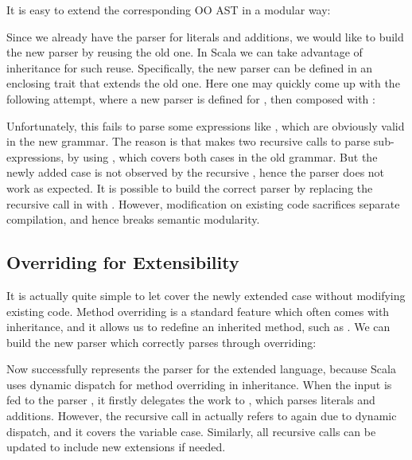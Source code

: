It is easy to extend the corresponding OO AST in a modular way:


Since we already have the parser for literals and additions, we would
like to build the new parser by reusing the old one. In Scala we can take advantage of inheritance for such reuse. Specifically,
the new parser can be defined in an enclosing trait that extends
the old one. Here one may quickly come up
with the following attempt, where a new parser is defined for , then composed
with :


Unfortunately, this fails to parse some expressions like , which are obviously valid in the new grammar.
The reason is that  makes two recursive calls to parse sub-expressions, by using , which
covers both cases in the old grammar. But the newly added case  is not observed by the recursive ,
hence the parser does not work as expected. It is possible to build the correct parser by replacing the recursive call in  with .
However, modification on existing code sacrifices separate compilation, and hence breaks semantic modularity.

\subsection{Overriding for Extensibility}\label{subsec:overriding}

It is actually quite simple to let  cover the newly
extended case without modifying existing code. Method overriding is a
standard feature which often comes with inheritance, and it allows us
to redefine an inherited method, such as . We can
build the new parser which correctly parses 
through overriding:


Now  successfully represents the parser for the extended language, because Scala uses dynamic dispatch for
method overriding in inheritance. When the input  is fed to the parser , it firstly delegates
the work to , which parses literals and additions. However, the recursive call  in 
actually refers to  again due to dynamic dispatch, and it covers the variable case. Similarly, all recursive calls can be updated to include new extensions if needed.


